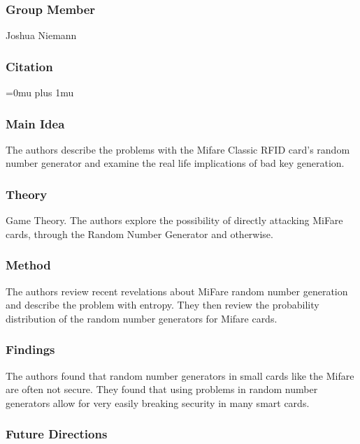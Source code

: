 \subsubsection{Group Member}

\noindent
Joshua Niemann

\noindent
\subsubsection{Citation}

\Urlmuskip=0mu plus 1mu\relax

\subsubsection{Main Idea}

\noindent
The authors describe the problems with the Mifare Classic RFID card's random number generator and examine the real life implications of bad key generation.

\subsubsection{Theory}

\noindent
Game Theory.  The authors explore the possibility of directly attacking MiFare cards, through the Random Number Generator and otherwise.

\subsubsection{Method}

\noindent
The authors review recent revelations about MiFare random number generation and describe the problem with entropy.  They then review the probability distribution of the random number generators for Mifare cards.

\subsubsection{Findings}

\noindent
The authors found that random number generators in small cards like the Mifare are often not secure.  They found that using problems in random number generators allow for very easily breaking security in many smart cards.

\subsubsection{Future Directions}

